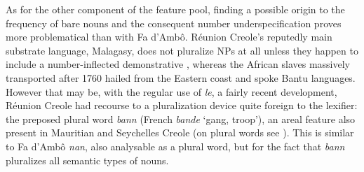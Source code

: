 \documentclass[output=paper]{langscibook}
\begin{document}
As for the other component of the feature pool, finding a possible origin to the frequency of bare nouns and the consequent number underspecification proves more problematical than with Fa d’Ambô. Réunion Creole’s reputedly main substrate language, Malagasy, does not pluralize NPs at all unless they happen to include a number-inflected demonstrative \citep[41--44]{Dez1980}, whereas the African slaves massively transported after 1760 hailed from the Eastern coast and spoke Bantu languages. However that may be, with the regular use of \textit{le}, a fairly recent development, Réunion Creole had recourse to a pluralization device quite foreign to the lexifier: the preposed plural word \textit{bann} (French \textit{bande} ‘gang, troop’), an areal feature also present in Mauritian and Seychelles Creole (on plural words see \citealt{Dryer2013coding}). This is similar to Fa d’Ambô \textit{nan}, also analysable as a plural word, but for the fact that \textit{bann} pluralizes all semantic types of nouns.
\end{document}
